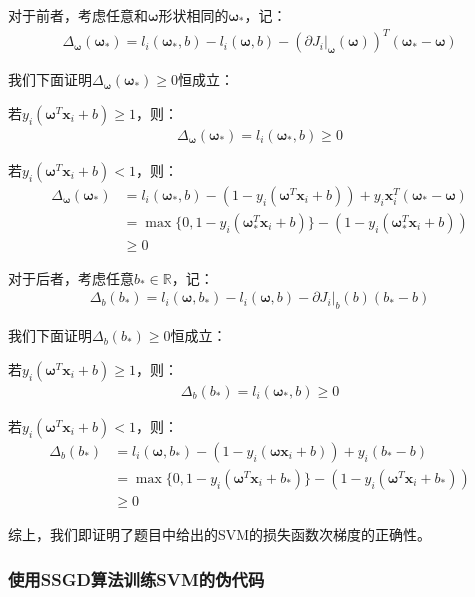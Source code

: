 \documentclass[12pt, a4paper]{article}
\newcommand{\ivec}{\bm}
\newcommand{\omegav}{\ivec{\omega}}
\newcommand{\xv}{\ivec{x}}
\begin{document}
        对于前者，考虑任意和$\omegav$形状相同的$\omegav_*$，记：
        \begin{align*}
        \Delta_{\omegav}(\omegav_*) = l_i(\omegav_*, b) - l_i(\omegav, b) - (\partial J_i \big|_{\omegav}(\omegav))^T (\omegav_* - \omegav)
        \end{align*}

        我们下面证明$\Delta_{\omegav}(\omegav_*) \ge 0$恒成立：

        若$y_i(\omegav^T \xv_i + b) \ge 1$，则：
        \begin{align*}
        \Delta_{\omegav}(\omegav_*) = l_i(\omegav_*, b) \ge 0
        \end{align*}

        若$y_i(\omegav^T \xv_i + b) < 1$，则：
        \begin{align*}
        \Delta_{\omegav}(\omegav_*)
        &= l_i(\omegav_*, b) - (1 - y_i (\omegav^T \xv_i + b)) + y_i \xv_i^T (\omegav_* - \omegav) \\
        &= \max\{0, 1 - y_i (\omegav_*^T \xv_i + b)\} - (1 - y_i (\omegav_*^T \xv_i + b)) \\
        &\ge 0
        \end{align*}

        对于后者，考虑任意$b_* \in \mathbb{R}$，记：
        \begin{align*}
        \Delta_{b}(b_*) = l_i(\omegav, b_*) - l_i(\omegav, b) - \partial J_i \big|_{b}(b) (b_* - b)
        \end{align*}

        我们下面证明$\Delta_{b}(b_*) \ge 0$恒成立：

        若$y_i(\omegav^T \xv_i + b) \ge 1$，则：
        \begin{align*}
        \Delta_{b}(b_*) = l_i(\omegav_*, b) \ge 0
        \end{align*}

        若$y_i(\omegav^T \xv_i + b) < 1$，则：
        \begin{align*}
        \Delta_{b}(b_*)
        &= l_i(\omegav, b_*) - (1 - y_i (\omegav \xv_i + b)) + y_i (b_* - b) \\
        &= \max\{0, 1 - y_i (\omegav^T \xv_i + b_*)\} - (1 - y_i (\omegav^T \xv_i + b_*)) \\
        &\ge 0
        \end{align*}

        综上，我们即证明了题目中给出的SVM的损失函数次梯度的正确性。

    \subsubsection{使用SSGD算法训练SVM的伪代码}
\end{document}
